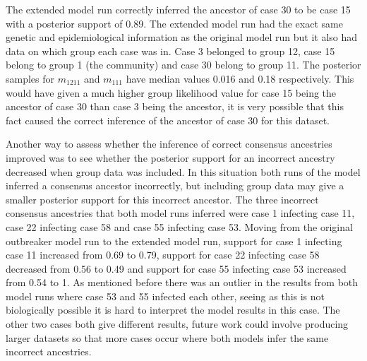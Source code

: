 \documentclass[11pt,a4paper]{report}
\begin{document}
The extended model run correctly inferred the ancestor of case 30 to be case 15 with a posterior support of 0.89. The extended model run had the exact same genetic and epidemiological information as the original model run but it also had data on which group each case was in. Case 3 belonged to group 12, case 15 belong to group 1 (the community) and case 30 belong to group 11. The posterior samples for $m_{12 11}$ and $m_{1 11}$ have median values 0.016 and 0.18 respectively. This would have given a much higher group likelihood value for case 15 being the ancestor of case 30 than case 3 being the ancestor, it is very possible that this fact caused the correct inference of the ancestor of case 30 for this dataset. 

Another way to assess whether the inference of correct consensus ancestries improved was to see whether the posterior support for an incorrect ancestry decreased when group data was included. In this situation both runs of the model inferred a consensus ancestor incorrectly, but including group data may give a smaller posterior support for this incorrect ancestor. The three incorrect consensus ancestries that both model runs inferred were case 1 infecting case 11, case 22 infecting case 58 and case 55 infecting case 53. Moving from the original outbreaker model run to the extended model run, support for case 1 infecting case 11 increased from 0.69 to 0.79, support for case 22 infecting case 58 decreased from 0.56 to 0.49 and support for case 55 infecting case 53 increased from 0.54 to 1. As mentioned before there was an outlier in the results from both model runs where case 53 and 55 infected each other, seeing as this is not biologically possible it is hard to interpret the model results in this case. The other two cases both give different results, future work could involve producing larger datasets so that more cases occur where both models infer the same incorrect ancestries.
\end{document}
